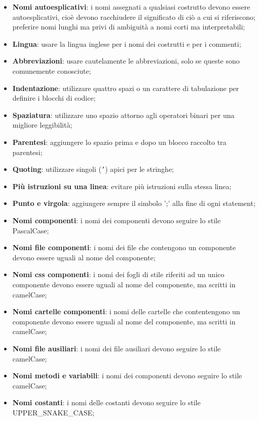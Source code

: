 \documentclass[10pt, a4paper]{article}
\begin{document}
\begin{itemize}
    \item \textbf{Nomi autoesplicativi}: i nomi assegnati a qualsiasi costrutto devono essere autoesplicativi, cioè devono racchiudere il significato di ciò a cui si riferiscono;
        preferire nomi lunghi ma privi di ambiguità a nomi corti ma interpretabili;
    \item \textbf{Lingua}: usare la lingua inglese per i nomi dei costrutti e per i commenti;
    \item \textbf{Abbreviazioni}: usare cautelamente le abbreviazioni, solo se queste sono comunemente conosciute;
    \item \textbf{Indentazione}: utilizzare quattro spazi o un carattere di tabulazione per definire i blocchi di codice;
    \item \textbf{Spaziatura}: utilizzare uno spazio attorno agli operatori binari per una migliore leggibilità;
    \item \textbf{Parentesi}: aggiungere lo spazio prima e dopo un blocco raccolto tra parentesi;
    \item \textbf{Quoting}: utilizzare singoli (\texttt{'}) apici per le stringhe;
    \item \textbf{Più istruzioni su una linea}: evitare più istruzioni sulla stessa linea;
    \item \textbf{Punto e virgola}: aggiungere sempre il simbolo ';' alla fine di ogni statement;
    \item \textbf{Nomi componenti}: i nomi dei componenti devono seguire lo stile PascalCase;
    \item \textbf{Nomi file componenti}: i nomi dei file che contengono un componente devono essere uguali al nome del componente;
    \item \textbf{Nomi css componenti}: i nomi dei fogli di stile riferiti ad un unico componente devono essere uguali al nome del componente, ma scritti in camelCase;
    \item \textbf{Nomi cartelle componenti}: i nomi delle cartelle che contentengono un componente devono essere uguali al nome del componente, ma scritti in camelCase;
    \item \textbf{Nomi file ausiliari}: i nomi dei file ausiliari devono seguire lo stile camelCase;
    \item \textbf{Nomi metodi e variabili}: i nomi dei componenti devono seguire lo stile camelCase;
    \item \textbf{Nomi costanti}: i nomi delle costanti devono seguire lo stile UPPER\_SNAKE\_CASE;
    \end{itemize}
\end{document}
